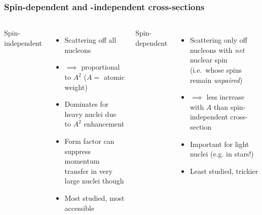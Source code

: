 \documentclass[xcolor=dvipsnames]{beamer}
\begin{document}
\begin{frame}
	\frametitle{Spin-dependent and -independent cross-sections}
	\begin{columns}[T]
		Spin-independent
		\begin{itemize}
		\item
		\alert<2>{Scattering off all nucleons}
		\item
		\alert<3>{$\implies$ proportional to $A^2$ ($A=$ atomic weight)}		
		\item
		\alert<4>{Dominates for heavy nuclei due to $A^2$ enhancement}
		\item
		\alert<4>{Form factor can suppress momentum transfer in very large nuclei though} 
		\item
		\alert<5>{Most studied, most accessible}  		
		\end{itemize}
		Spin-dependent
		\begin{itemize}
		\item
		\alert<2>{Scattering only off nucleons with \emph{net} nuclear spin (i.e.~whose spins remain \emph{unpaired})}
		\item
		\alert<3>{$\implies$ less increase with $A$ than spin-independent cross-section}		
		\item
		\alert<4>{Important for light nuclei (e.g. in stars!)}
		\item
		\alert<5>{Least studied, trickier}		
		\end{itemize}
	\end{columns}
\end{frame}
\end{document}
